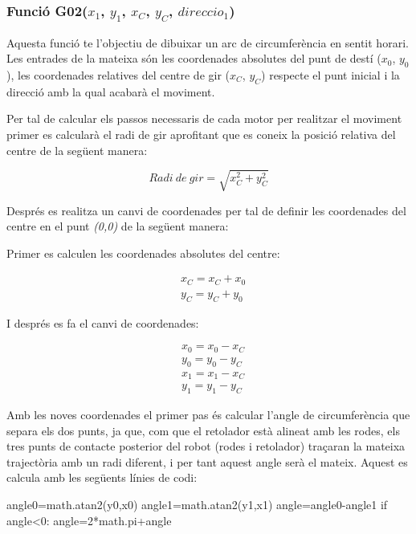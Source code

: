 \subsubsection{Funció G02($x_{1}$, $y_{1}$, $x_{C}$, $y_{C}$, $direccio_{1}$)}\label{funG02}

Aquesta funció te l’objectiu de dibuixar un arc de circumferència en sentit horari. Les entrades de la mateixa són les coordenades absolutes del punt de destí ($x_{0}$, $y_{0}$), les coordenades relatives del centre de gir ($x_{C}$, $y_{C}$) respecte el punt inicial i la direcció amb la qual acabarà el moviment. 

Per tal de calcular els passos necessaris de cada motor per realitzar el moviment primer es calcularà el radi de gir aprofitant que es coneix la posició relativa del centre de la següent manera:

\begin{equation}
Radi \ de \ gir = \sqrt{x_{C}^2+y_{C}^2}
\end{equation}


Després es realitza un canvi de coordenades per tal de definir les coordenades del centre en el punt \emph{(0,0)} de la següent manera:

Primer es calculen les coordenades absolutes del centre:

\begin{eqnarray}
\nonumber & x_{C}=x_{C}+x_{0} \\
& y_{C}=y_{C}+y_{0}
\end{eqnarray}

I després es fa el canvi de coordenades:

\begin{eqnarray}
\nonumber & x_{0}=x_{0}-x_{C} \\
\nonumber & y_{0}=y_{0}-y_{C} \\
\nonumber & x_{1}=x_{1}-x_{C} \\
& y_{1}=y_{1}-y_{C}
\end{eqnarray}

Amb les noves coordenades el primer pas és calcular l’angle de circumferència que separa els dos punts, ja que, com que el retolador està alineat amb les rodes, els tres punts de contacte posterior del robot (rodes i retolador) traçaran la mateixa trajectòria amb un radi diferent, i per tant aquest angle serà el mateix. Aquest es calcula amb les següents línies de codi:

\begin{python}
angle0=math.atan2(y0,x0)
angle1=math.atan2(y1,x1)
angle=angle0-angle1
if angle<0:
angle=2*math.pi+angle
\end{python}

